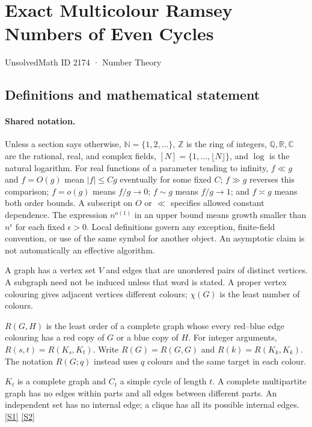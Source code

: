 \documentclass[11pt,a4paper]{article}
\newcommand{\N}{\mathbb{N}}
\newcommand{\Z}{\mathbb{Z}}
\newcommand{\Q}{\mathbb{Q}}
\newcommand{\R}{\mathbb{R}}
\newcommand{\C}{\mathbb{C}}
\newcommand{\sref}[2]{\hyperlink{source:#1:#2}{[S#2]}}
\begin{document}

\setcounter{section}{2173}

\section{Exact Multicolour Ramsey Numbers of Even Cycles}\label{2174}

{\small\sffamily UnsolvedMath ID 2174 · Number Theory}

\subsection{Definitions and mathematical statement}

\paragraph{Shared notation.}Unless a section says otherwise, $\N=\{1,2,\ldots\}$,
$\Z$ is the ring of integers, $\Q,\R,\C$ are the rational, real, and complex
fields, $[N]=\{1,\ldots,\lfloor N\rfloor\}$, and $\log$ is the natural
logarithm. For real functions of a parameter tending to infinity,
$f\ll g$ and $f=O(g)$ mean $|f|\leq Cg$ eventually for some fixed $C$;
$f\gg g$ reverses this comparison; $f=o(g)$ means $f/g\to0$;
$f\sim g$ means $f/g\to1$; and $f\asymp g$ means both order bounds.
A subscript on $O$ or $\ll$ specifies allowed constant dependence.
The expression $n^{o(1)}$ in an upper bound means growth smaller than
$n^\epsilon$ for each fixed $\epsilon>0$. Local definitions govern any
exception, finite-field convention, or use of the same symbol for another
object. An asymptotic claim is not automatically an effective algorithm.



A graph has a vertex set $V$ and edges that are unordered pairs of distinct vertices. A subgraph need not be induced unless that word is stated. A proper vertex colouring gives adjacent vertices different colours; $\chi(G)$ is the least number of colours.

$R(G,H)$ is the least order of a complete graph whose every red--blue edge colouring has a red copy of $G$ or a blue copy of $H$. For integer arguments, $R(s,t)=R(K_s,K_t)$. Write $R(G)=R(G,G)$ and $R(k)=R(K_k,K_k)$. The notation $R(G;q)$ instead uses $q$ colours and the same target in each colour.

$K_t$ is a complete graph and $C_t$ a simple cycle of length $t$. A complete multipartite graph has no edges within parts and all edges between different parts. An independent set has no internal edge; a clique has all its possible internal edges. \sref{2174}{1} \sref{2174}{2}
\end{document}

